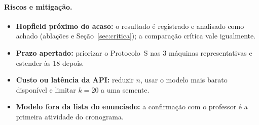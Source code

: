 \paragraph{Riscos e mitigação.}
\begin{itemize}
  \item \textbf{Hopfield próximo do acaso:} o resultado é registrado e analisado como achado (ablações e
        Seção~\ref{sec:critica}); a comparação crítica vale igualmente.
  \item \textbf{Prazo apertado:} priorizar o Protocolo~S nas 3 máquinas representativas e estender às 18 depois.
  \item \textbf{Custo ou latência da API:} reduzir $n$, usar o modelo mais barato disponível e limitar $k=20$ a
        uma semente.
  \item \textbf{Modelo fora da lista do enunciado:} a confirmação com o professor é a primeira atividade do
        cronograma.
\end{itemize}
